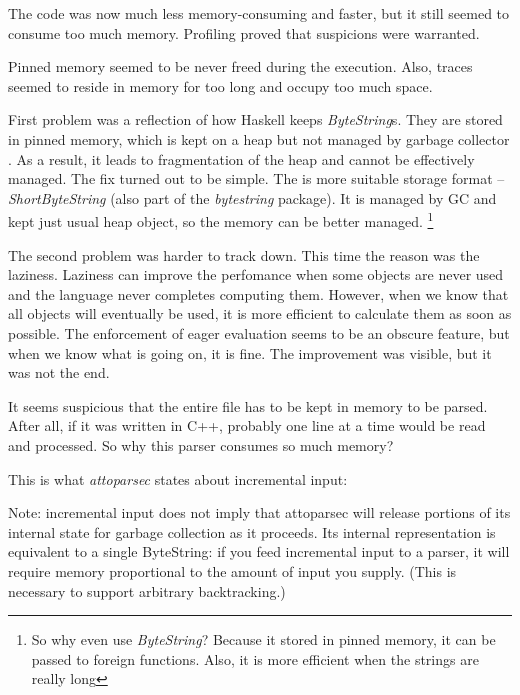 The code was now much less memory-consuming and faster, but it still seemed to consume too much memory.
Profiling proved that suspicions were warranted.


Pinned memory seemed to be never freed during the execution. Also, traces seemed to reside in memory
for too long and occupy too much space. 

First problem was a reflection of how Haskell keeps \emph{ByteString}s.
They are stored in pinned memory, which is kept on a heap but 
not managed by garbage collector \cite{haskell:shortbytestring-and-text}. 
As a result, it leads to fragmentation of the heap and cannot be effectively managed.
The fix turned out to be simple. The is more suitable storage format -- \emph{ShortByteString} 
(also part of the \emph{bytestring} package). It is managed
by GC and kept just usual heap object, so the memory can be better managed.
\footnote{So why even use \emph{ByteString}? Because it stored in pinned memory, it can be passed to foreign functions.
Also, it is more efficient when the strings are really long}

The second problem was harder to track down. This time the reason was the laziness.
Laziness can improve the perfomance when some objects are never used and the language never completes
computing them. However, when we know that all objects will eventually be used, it is more efficient
to calculate them as soon as possible. The enforcement of eager evaluation seems to be an obscure
feature, but when we know what is going on, it is fine.
The improvement was visible, but it was not the end.


It seems suspicious that the entire file has to be kept in memory to be parsed. After all, if it was written in C++,
probably one line at a time would be read and processed. So why this parser consumes so much memory?

This is what \emph{attoparsec} states about incremental input:

\begin{displayquote}
Note: incremental input does not imply that attoparsec will release portions of its internal state for 
garbage collection as it proceeds. Its internal representation is equivalent to a single ByteString: 
if you feed incremental input to a parser, it will require memory proportional to the amount of input you supply. 
(This is necessary to support arbitrary backtracking.)
\end{displayquote}

